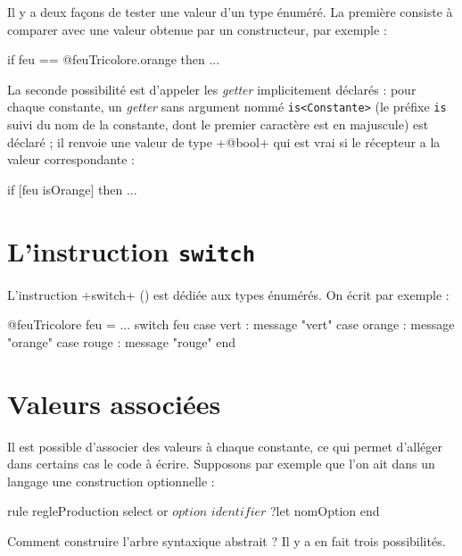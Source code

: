 
Il y a deux façons de tester une valeur d'un type énuméré. La première consiste à comparer avec une valeur obtenue par un constructeur, par exemple :
\begin{galgas3}
  if feu == @feuTricolore.orange then ...
\end{galgas3}

La seconde possibilité est d'appeler les \emph{getter} implicitement déclarés : pour chaque constante, un \emph{getter} sans argument nommé  \texttt{is<Constante>} (le préfixe \texttt{is} suivi du nom de la constante, dont le premier caractère est en majuscule) est déclaré ; il renvoie une valeur de type \ggst+@bool+ qui est vrai si le récepteur a la valeur correspondante :
\begin{galgas3}
  if [feu isOrange] then ...
\end{galgas3}

\section{L'instruction \texttt{switch}}

L'instruction \ggst+switch+ () est dédiée aux types énumérés. On écrit par exemple :

\begin{galgas3}
@feuTricolore feu = ...
switch feu
case vert : message "vert"
case orange : message "orange"
case rouge : message "rouge"
end
\end{galgas3}











\section{Valeurs associées}

Il est possible d'associer des valeurs à chaque constante, ce qui permet d'alléger dans certains cas le code à écrire. Supposons par exemple que l'on ait dans un langage une construction optionnelle :

\begin{galgas3}
rule regleProduction {
  select
  or
    $option$
    $identifier$ ?let nomOption
  end
}
\end{galgas3}

Comment construire l'arbre syntaxique abstrait ? Il y a en fait trois possibilités.

